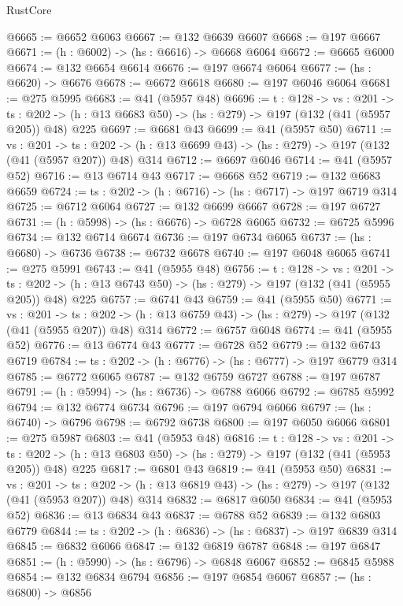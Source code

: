 \begin{lexlean}{RustCore}
\begin{coremodule}
@6665 := @6652 @6063
@6667 := @132 @6639 @6607
@6668 := @197 @6667
@6671 := (h : @6002) -> (hs : @6616) -> @6668 @6064
@6672 := @6665 @6000
@6674 := @132 @6654 @6614
@6676 := @197 @6674 @6064
@6677 := (hs : @6620) -> @6676
@6678 := @6672 @6618
@6680 := @197 @6046 @6064
@6681 := @275 @5995
@6683 := @41 (@5957 @48)
@6696 := {t : @128} ->
  {vs : @201} ->
  {ts : @202} -> (h : @13 @6683 @50) -> (hs : @279) -> @197 (@132 (@41 (@5957 @205)) @48) @225
@6697 := @6681 @43
@6699 := @41 (@5957 @50)
@6711 := {vs : @201} ->
  {ts : @202} -> (h : @13 @6699 @43) -> (hs : @279) -> @197 (@132 (@41 (@5957 @207)) @48) @314
@6712 := @6697 @6046
@6714 := @41 (@5957 @52)
@6716 := @13 @6714 @43
@6717 := @6668 @52
@6719 := @132 @6683 @6659
@6724 := {ts : @202} -> (h : @6716) -> (hs : @6717) -> @197 @6719 @314
@6725 := @6712 @6064
@6727 := @132 @6699 @6667
@6728 := @197 @6727
@6731 := (h : @5998) -> (hs : @6676) -> @6728 @6065
@6732 := @6725 @5996
@6734 := @132 @6714 @6674
@6736 := @197 @6734 @6065
@6737 := (hs : @6680) -> @6736
@6738 := @6732 @6678
@6740 := @197 @6048 @6065
@6741 := @275 @5991
@6743 := @41 (@5955 @48)
@6756 := {t : @128} ->
  {vs : @201} ->
  {ts : @202} -> (h : @13 @6743 @50) -> (hs : @279) -> @197 (@132 (@41 (@5955 @205)) @48) @225
@6757 := @6741 @43
@6759 := @41 (@5955 @50)
@6771 := {vs : @201} ->
  {ts : @202} -> (h : @13 @6759 @43) -> (hs : @279) -> @197 (@132 (@41 (@5955 @207)) @48) @314
@6772 := @6757 @6048
@6774 := @41 (@5955 @52)
@6776 := @13 @6774 @43
@6777 := @6728 @52
@6779 := @132 @6743 @6719
@6784 := {ts : @202} -> (h : @6776) -> (hs : @6777) -> @197 @6779 @314
@6785 := @6772 @6065
@6787 := @132 @6759 @6727
@6788 := @197 @6787
@6791 := (h : @5994) -> (hs : @6736) -> @6788 @6066
@6792 := @6785 @5992
@6794 := @132 @6774 @6734
@6796 := @197 @6794 @6066
@6797 := (hs : @6740) -> @6796
@6798 := @6792 @6738
@6800 := @197 @6050 @6066
@6801 := @275 @5987
@6803 := @41 (@5953 @48)
@6816 := {t : @128} ->
  {vs : @201} ->
  {ts : @202} -> (h : @13 @6803 @50) -> (hs : @279) -> @197 (@132 (@41 (@5953 @205)) @48) @225
@6817 := @6801 @43
@6819 := @41 (@5953 @50)
@6831 := {vs : @201} ->
  {ts : @202} -> (h : @13 @6819 @43) -> (hs : @279) -> @197 (@132 (@41 (@5953 @207)) @48) @314
@6832 := @6817 @6050
@6834 := @41 (@5953 @52)
@6836 := @13 @6834 @43
@6837 := @6788 @52
@6839 := @132 @6803 @6779
@6844 := {ts : @202} -> (h : @6836) -> (hs : @6837) -> @197 @6839 @314
@6845 := @6832 @6066
@6847 := @132 @6819 @6787
@6848 := @197 @6847
@6851 := (h : @5990) -> (hs : @6796) -> @6848 @6067
@6852 := @6845 @5988
@6854 := @132 @6834 @6794
@6856 := @197 @6854 @6067
@6857 := (hs : @6800) -> @6856

\end{coremodule}
\end{lexlean}
